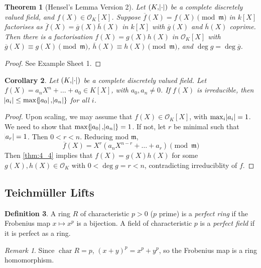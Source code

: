\documentclass[11pt]{article}
\theoremstyle{definition}
\newtheorem{definition}{Definition}[subsection]
\theoremstyle{plain}
\newtheorem{theorem}[definition]{Theorem}
\newtheorem{corollary}[definition]{Corollary}
\theoremstyle{remark}
\newtheorem*{remark}{Remark}
\DeclareMathOperator{\Char}{char}
\newcommand{\cO}{\mathcal{O}}
\newcommand{\fm}{\mathfrak{m}}
\begin{document}
\begin{theorem}[Hensel's Lemma Version 2]\label{thm:4_4}
    Let $(K, \abs{\cdot})$ be a complete discretely valued field, and $f(X) \in \cO_K[X]$. Suppose $\overline{f}(X) = f(X) \pmod{\fm}$ in $k[X]$ factorises as $\overline{f}(X) = \overline{g}(X) \overline{h}(X)$ in $k[X]$ with $\overline{g}(X)$ and $\overline{h}(X)$ coprime. Then there is a factorisation $f(X) = g(X) h(X)$ in $\cO_K[X]$ with $\overline{g}(X) \equiv g(X) \pmod{\fm}$, $\overline{h}(X) \equiv h(X) \pmod{\fm}$, and $\deg{g} = \deg{\overline{g}}$.
\end{theorem}
\begin{proof}
    See Example Sheet 1.
\end{proof}

\begin{corollary}\label{cor:4_5}
    Let $(K, \abs{\cdot})$ be a complete discretely valued field. Let $f(X) = a_n X^n + \ldots + a_0 \in K[X]$, with $a_0, a_n \neq 0$. If $f(X)$ is irreducible, then $\abs{a_i} \le \max\{\abs{a_0}, \abs{a_n}\}$ for all $i$.
\end{corollary}

\begin{proof}
    Upon scaling, we may assume that $f(X) \in \cO_K[X]$, with $\max_i \abs{a_i} = 1$. We need to show that $\max \{\abs{a_0}, \abs{a_n}\} = 1$. If not, let $r$ be minimal such that $\abs{a_r} = 1$. Then $0 < r < n$. Reducing mod $\fm$,
    \begin{equation*}
        \overline{f}(X) = X^r (a_n X^{n-r} + \ldots + a_r) \pmod{\fm}
    \end{equation*}
    Then \autoref{thm:4_4} implies that $f(X) = g(X) h(X)$ for some $g(X), h(X) \in \cO_K$ with $0 < \deg{g} = r < n$, contradicting irreduciblity of $f$.
\end{proof}

\subsection{Teichm\"uller Lifts}

\begin{definition}\label{def:5_1}
    A ring $R$ of characteristic $p > 0$ ($p$ prime) is a \emph{perfect ring} if the Frobenius map $x \mapsto x^p$ is a bijection. A field of characteristic $p$ is a \emph{perfect field} if it is perfect as a ring.
\end{definition}

\begin{remark}
    Since $\Char R = p$, $(x+y)^p = x^p + y^p$, so the Frobenius map is a ring homomorphism.
\end{remark}
\end{document}

